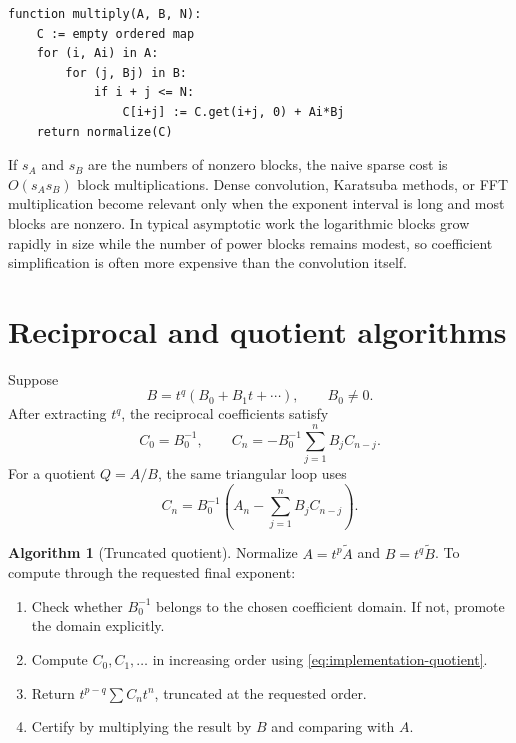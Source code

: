 \documentclass[11pt,openany]{book}
\theoremstyle{definition}
\newtheorem{algorithm}{Algorithm}[chapter]
\theoremstyle{plain}
\theoremstyle{remark}
\begin{document}
\begin{lstlisting}[style=pseudo,caption={Sparse block multiplication}]
function multiply(A, B, N):
    C := empty ordered map
    for (i, Ai) in A:
        for (j, Bj) in B:
            if i + j <= N:
                C[i+j] := C.get(i+j, 0) + Ai*Bj
    return normalize(C)
\end{lstlisting}

If \(s_A\) and \(s_B\) are the numbers of nonzero blocks, the naive sparse cost is \(O(s_As_B)\) block multiplications. Dense convolution, Karatsuba methods, or FFT multiplication become relevant only when the exponent interval is long and most blocks are nonzero. In typical asymptotic work the logarithmic blocks grow rapidly in size while the number of power blocks remains modest, so coefficient simplification is often more expensive than the convolution itself.

\section{Reciprocal and quotient algorithms}
Suppose
\[
 B=t^q(B_0+B_1t+\cdots),\qquad B_0\ne0.
\]
After extracting \(t^q\), the reciprocal coefficients satisfy
\begin{equation}\label{eq:implementation-reciprocal}
 C_0=B_0^{-1},
 \qquad
 C_n=-B_0^{-1}\sum_{j=1}^{n}B_jC_{n-j}.
\end{equation}
For a quotient \(Q=A/B\), the same triangular loop uses
\begin{equation}\label{eq:implementation-quotient}
 C_n=B_0^{-1}\left(A_n-\sum_{j=1}^{n}B_jC_{n-j}\right).
\end{equation}

\begin{algorithm}[Truncated quotient]\label{alg:sparse-quotient}
Normalize \(A=t^p\widetilde A\) and \(B=t^q\widetilde B\). To compute through the requested final exponent:
\begin{enumerate}
\item Check whether \(B_0^{-1}\) belongs to the chosen coefficient domain. If not, promote the domain explicitly.
\item Compute \(C_0,C_1,\ldots\) in increasing order using \cref{eq:implementation-quotient}.
\item Return \(t^{p-q}\sum C_nt^n\), truncated at the requested order.
\item Certify by multiplying the result by \(B\) and comparing with \(A\).
\end{enumerate}
\end{algorithm}
\end{document}
